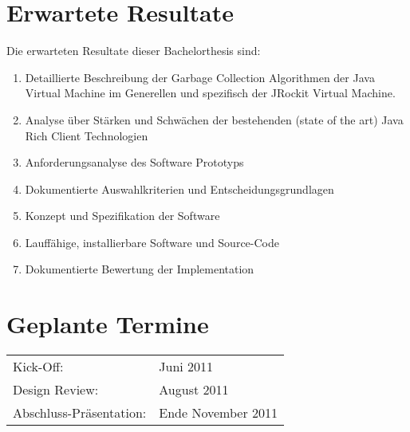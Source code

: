 \section{Erwartete Resultate}
Die erwarteten Resultate dieser Bachelorthesis sind:
\begin{enumerate}
\item Detaillierte Beschreibung der Garbage Collection Algorithmen der Java Virtual 
    Machine im Generellen und spezifisch der JRockit Virtual Machine.
\item Analyse über Stärken und Schwächen der bestehenden (state of the art) Java 
    Rich Client Technologien
\item Anforderungsanalyse des Software Prototyps
\item Dokumentierte Auswahlkriterien und Entscheidungsgrundlagen
\item Konzept und Spezifikation der Software
\item Lauffähige, installierbare Software und Source-Code
\item Dokumentierte Bewertung der Implementation
\end{enumerate}

\section{Geplante Termine}
\begin{tabular}[ht]{ll}
Kick-Off: & Juni 2011\\
Design Review: & August 2011\\
Abschluss-Präsentation: & Ende November 2011\\
\end{tabular}

